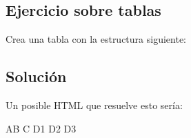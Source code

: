 \documentclass[letterpaper,10pt,spanish]{sphinxmanual}
\begin{document}
\subsection{Ejercicio sobre tablas}
\label{\detokenize{tema2:ejercicio-sobre-tablas}}
Crea una tabla con la estructura siguiente:



\subsection{Solución}
\label{\detokenize{tema2:solucion}}
Un posible HTML que resuelve esto sería:

\begin{sphinxVerbatim}[commandchars=\\\{\}]
 
                        AB
                        C
                                                D1
                                                D2
                                                D3

\end{sphinxVerbatim}
\end{document}
